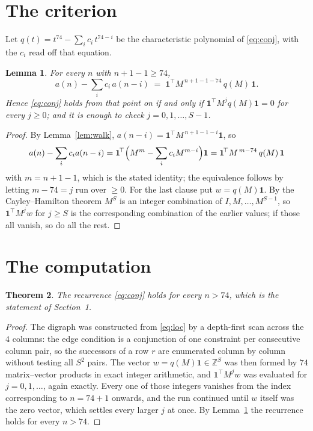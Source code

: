 \documentclass[11pt,a4paper]{article}
\theoremstyle{plain}
\newtheorem{theorem}{Theorem}
\newtheorem{lemma}[theorem]{Lemma}
\theoremstyle{definition}
\begin{document}
\section{The criterion}

Let $q(t)=t^{74}-\sum_i c_i\,t^{74-i}$ be the characteristic polynomial of
\eqref{eq:conj}, with the $c_i$ read off that equation.

\begin{lemma}\label{lem:crit}
For every $n$ with $n+1-1\ge74$,
\[
a(n)-\sum_i c_i\,a(n-i)\;=\;\mathbf{1}^{\!\top}M^{\,n+1-1-74}\,q(M)\,\mathbf{1} .
\]
Hence \eqref{eq:conj} holds from that point on if and only if
$\mathbf{1}^{\!\top}M^{j}q(M)\mathbf{1}=0$ for every $j\ge0$; and it is enough to check
$j=0,1,\dots,S-1$.
\end{lemma}

\begin{proof}
By Lemma~\ref{lem:walk}, $a(n-i)=\mathbf{1}^{\!\top}M^{\,n+1-1-i}\mathbf{1}$, so
\[
a(n)-\sum_i c_i a(n-i)
=\mathbf{1}^{\!\top}\Bigl(M^{m}-\sum_i c_i M^{m-i}\Bigr)\mathbf{1}
=\mathbf{1}^{\!\top}M^{\,m-74}\,q(M)\,\mathbf{1}
\]
with $m=n+1-1$, which is the stated identity; the equivalence follows by letting
$m-74=j$ run over $\ge0$. For the last clause put $w=q(M)\mathbf{1}$. By the
Cayley--Hamilton theorem $M^{S}$ is an integer combination of $I,M,\dots,M^{S-1}$, so
$\mathbf{1}^{\!\top}M^{j}w$ for $j\ge S$ is the corresponding combination of the earlier
values; if those all vanish, so do all the rest.
\end{proof}

\section{The computation}

\begin{theorem}
The recurrence \eqref{eq:conj} holds for every $n>74$, which is the statement of
Section~1.
\end{theorem}

\begin{proof}
The digraph was constructed from \eqref{eq:loc} by a depth-first scan across the $4$
columns: the edge condition is a conjunction of one constraint per consecutive column
pair, so the successors of a row $r$ are enumerated column by column without testing all
$S^2$ pairs. The vector $w=q(M)\mathbf{1}\in\mathbb{Z}^{S}$ was then formed by $74$
matrix--vector products in exact integer arithmetic, and $\mathbf{1}^{\!\top}M^{j}w$ was
evaluated for $j=0,1,\dots$, again exactly. Every one of those integers vanishes from the
index corresponding to $n=74+1$ onwards, and the run continued until $w$ itself was the
zero vector, which settles every larger $j$ at once. By Lemma~\ref{lem:crit} the recurrence
holds for every $n>74$.
\end{proof}
\end{document}

